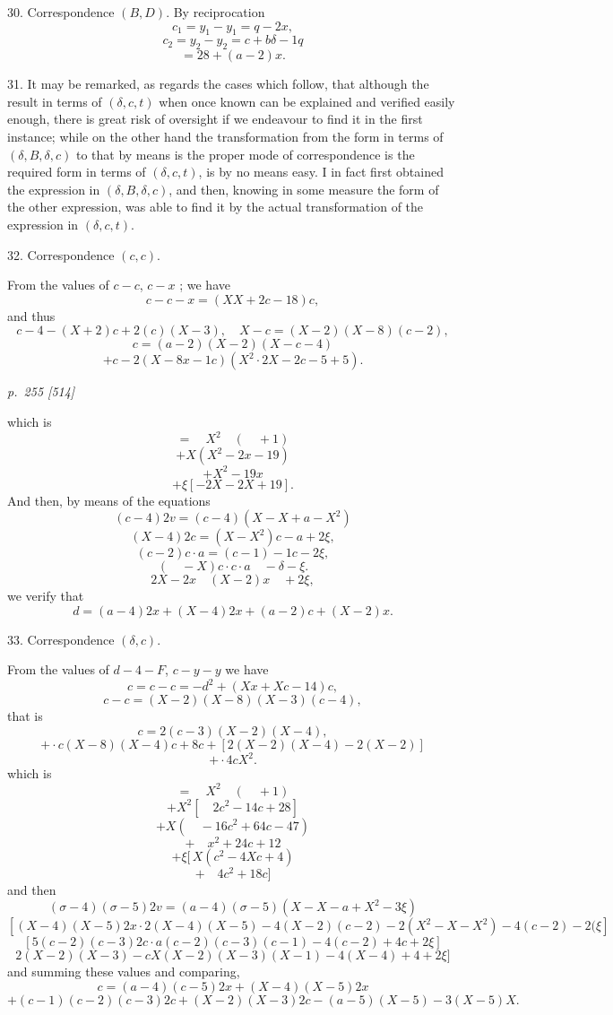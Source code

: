 \documentclass[11pt,a4paper]{article}
\theoremstyle{plain}
\theoremstyle{definition}
\begin{document}
30.  Correspondence $(B, D)$.  By reciprocation
\[
c_1 = y_1 - y_1 = q - 2x,
\]
\[
c_2 = y_2 - y_2 = c + b\delta - 1q
\]
\[
= 28 + (a - 2)x.
\]

31.  It may be remarked, as regards the cases which follow, that although the
result in terms of $(\delta, c, t)$ when once known can be explained and verified easily
enough, there is great risk of oversight if we endeavour to find it in the first
instance; while on the other hand the transformation from the form in terms of
$(\delta, B, \delta, c)$ to that by means is the proper mode of correspondence is the required form in
terms of $(\delta, c, t)$, is by no means easy.  I in fact first obtained the expression in $(\delta, B, \delta, c)$,
and then, knowing in some measure the form of the other expression, was able to
find it by the actual transformation of the expression in $(\delta, c, t)$.

32.  Correspondence $(c, c)$.

From the values of $c - c$, $c - x$ ; we have
\[
c - c - x = (XX + 2c - 18)c,
\]
and thus
\[
c - 4 - (X + 2)c + 2(c)(X - 3), \quad X - c = (X - 2)(X - 8)(c - 2),
\]
\[
c = (a - 2)(X - 2)(X - c - 4)
\]
\[
+ c - 2(X - 8x - 1c)(X^2 \cdot 2X - 2c - 5 + 5).
\]

\clearpage

\bigskip
\textit{p.~255 [514]}
\smallskip

\noindent
which is
\[
= \quad X^2 \quad ( \quad + 1)
\]
\[
+ X (X^2 - 2x - 19)
\]
\[
+ X^2 - 19x
\]
\[
+ \xi [-2X - 2X + 19].
\]
And then, by means of the equations
\[
(c - 4) 2v = (c - 4)(X - X + a - X^2)
\]
\[
(X - 4)2c = (X - X^2)c - a + 2\xi,
\]
\[
(c - 2)c \cdot a = (c - 1) - 1c - 2\xi,
\]
\[
(\quad - X)c \cdot c \cdot a \quad - \delta - \xi.
\]
\[
2X - 2x \quad (X - 2)x \quad + 2\xi,
\]
we verify that
\[
d = (a - 4)2x + (X - 4)2x + (a - 2)c + (X - 2)x.
\]

33.  Correspondence $(\delta, c)$.

From the values of $d - 4 - F$, $c - y - y$ we have
\[
c = c - c = -d^2 + (Xx + Xc - 14)c,
\]
\[
c - c = (X - 2)(X - 8)(X - 3)(c - 4),
\]
that is
\[
c = 2(c - 3)(X - 2)(X - 4),
\]
\[
+ \cdot c (X - 8)(X - 4)c + 8c + [2(X - 2)(X - 4) - 2(X - 2)]
\]
\[
+ \cdot 4c X^2.
\]
which is
\[
= \quad X^2 \quad ( \quad + 1)
\]
\[
+ X^2 [\quad 2c^2 - 14c + 28]
\]
\[
+ X (\quad - 16c^2 + 64c - 47)
\]
\[
+ \quad x^2 + 24c + 12
\]
\[
+ \xi [\,X(c^2 - 4Xc + 4)
\]
\[
+ \quad 4c^2 + 18c]
\]
and then
\[
(\sigma - 4)(\sigma - 5) 2v = (a - 4)(\sigma - 5)(X - X - a + X^2 - 3\xi)
\]
\[
[(X - 4)(X - 5) 2x \cdot 2(X - 4)(X - 5) - 4(X - 2)(c - 2) - 2(X^2 - X - X^2) - 4(c - 2) - 2(\xi]
\]
\[
[5(c - 2)(c - 3) 2c \cdot a (c - 2)(c - 3)(c - 1) - 4(c - 2) + 4c + 2\xi]
\]
\[
2(X - 2)(X - 3) - cX(X - 2)(X - 3)(X - 1) - 4(X - 4) + 4 + 2\xi]
\]
and summing these values and comparing,
\[
c = (a - 4)(c - 5) 2x + (X - 4)(X - 5) 2x
\]
\[
+ (c - 1)(c - 2)(c - 3) 2c + (X - 2)(X - 3) 2c - (a - 5)(X - 5) - 3(X - 5)X.
\]
\end{document}
